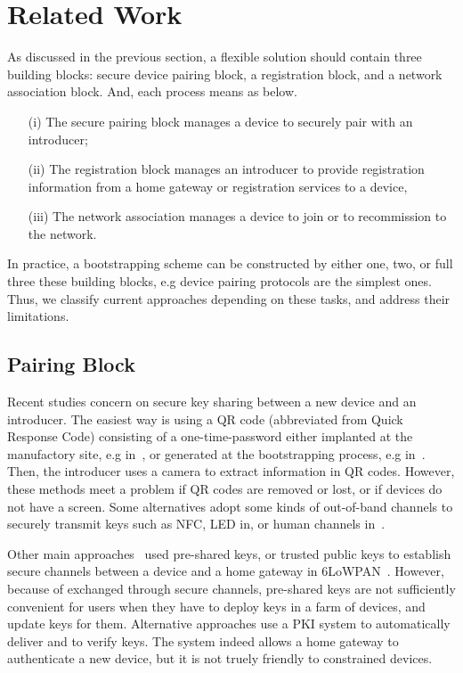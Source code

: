 \section{Related Work}\label{buildingblocks}

As discussed in the previous section, a flexible solution should contain three building blocks: secure device pairing block, a registration block, and a network association block. And, each process means as below. 
\begin{enumerate}
\item [(i)] The secure pairing block manages a device to securely pair with an introducer; 
\item [(ii)] The registration block manages an introducer to provide registration information from a home gateway or registration services to a device,
\item [(iii)] The network association manages a device to join or to recommission to the network.
\end{enumerate}

In practice, a bootstrapping scheme can be constructed by either one, two, or full three these building blocks, e.g device pairing protocols are the simplest ones. Thus, we classify current approaches depending on these tasks, and address their limitations. 

\subsection{Pairing Block}
Recent studies concern on secure key sharing between a new device and an introducer. The easiest way is using a QR code (abbreviated from Quick Response Code) consisting of a one-time-password either implanted at the manufactory site, e.g in~\cite{Jeanning2013}, or generated at the bootstrapping process, e.g in~\cite{Seung2015}. Then, the introducer uses a camera to extract information in QR codes. However, these methods meet a problem if QR codes are removed or lost, or if devices do not have a screen. Some alternatives adopt some kinds of out-of-band channels to securely transmit keys such as NFC, LED in\cite{4159919}, or human channels in~\cite{5654588}.

Other main approaches~\cite{JCMjcm0708634642, Cha:2011:LSE:1968613.1968679, Ikram:2009:SLA:1582379.1582583, 6263790} used pre-shared keys, or trusted public keys to establish secure channels between a device and a home gateway in 6LoWPAN~\cite{6lowpan}. However, because of exchanged through secure channels, pre-shared keys are not sufficiently convenient for users when they have to deploy keys in a farm of devices, and update keys for them. Alternative approaches use a PKI system to automatically deliver and to verify keys. The system indeed allows a home gateway to authenticate a new device, but it is not truely friendly to constrained devices. 

